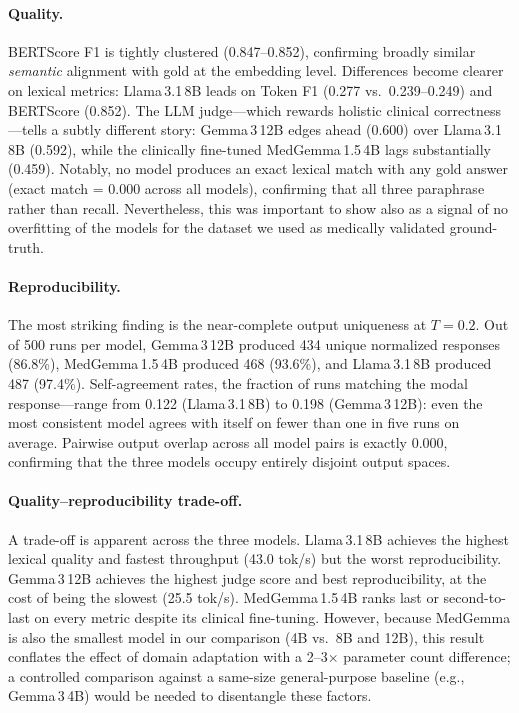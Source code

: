 \documentclass[11pt]{article}
\begin{document}
\paragraph{Quality.}
BERTScore F1 is tightly clustered (0.847--0.852), confirming broadly
similar \emph{semantic} alignment with gold at the embedding level.
Differences become clearer on lexical metrics:
Llama\,3.1\,8B leads on Token F1 (0.277 vs.\ 0.239--0.249) and
BERTScore (0.852).
The LLM judge---which rewards holistic clinical correctness---tells
a subtly different story: Gemma\,3\,12B edges ahead (0.600) over
Llama\,3.1\,8B (0.592), while the clinically fine-tuned
MedGemma\,1.5\,4B lags substantially (0.459).
Notably, no model produces an exact lexical match with any gold
answer (exact match = 0.000 across all models), confirming that
all three paraphrase rather than recall. Nevertheless, this was important
to show also as a signal of no overfitting of the models for the dataset
we used as medically validated ground-truth. 

\paragraph{Reproducibility.}
The most striking finding is the near-complete output uniqueness at
$T{=}0.2$.
Out of 500 runs per model, Gemma\,3\,12B produced 434 unique
normalized responses (86.8\%), MedGemma\,1.5\,4B produced 468
(93.6\%), and Llama\,3.1\,8B produced 487 (97.4\%).
Self-agreement rates, the fraction of runs matching the modal
response---range from 0.122 (Llama\,3.1\,8B) to 0.198
(Gemma\,3\,12B): even the most consistent model agrees with itself
on fewer than one in five runs on average.
Pairwise output overlap across all model pairs is exactly 0.000,
confirming that the three models occupy entirely disjoint output spaces.

\paragraph{Quality--reproducibility trade-off.}
A trade-off is apparent across the three models.
Llama\,3.1\,8B achieves the highest lexical quality and fastest
throughput (43.0 tok/s) but the worst reproducibility.
Gemma\,3\,12B achieves the highest judge score and best
reproducibility, at the cost of being the slowest (25.5 tok/s).
MedGemma\,1.5\,4B ranks last or second-to-last on every metric
despite its clinical fine-tuning.
However, because MedGemma is also the smallest model in our comparison
(4B vs.\ 8B and 12B), this result conflates the effect of domain
adaptation with a 2--3$\times$ parameter count difference;
a controlled comparison against a same-size general-purpose baseline
(e.g., Gemma\,3\,4B) would be needed to disentangle these factors.
\end{document}
